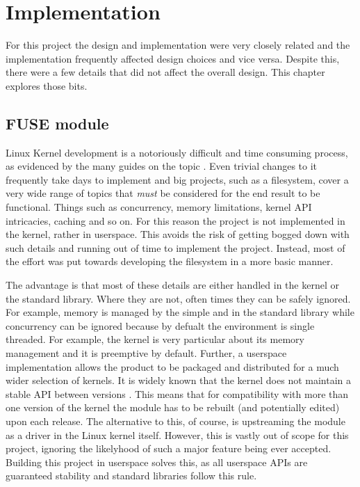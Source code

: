 \chapter{Implementation}

    For this project the design and implementation were very closely related
    and the implementation frequently affected design choices and vice versa.
    Despite this, there were a few details that did not affect the overall
    design. This chapter explores those bits.

    \section{FUSE module}
        \label{sec_FUSE}

        Linux Kernel development is a notoriously difficult and time consuming
        process, as evidenced by the many guides on the topic
        \cite{kernelnewbies_developer} \cite{Linux_howto}. Even trivial changes
        to it frequently take days to implement and big projects, such as a
        filesystem, cover a very wide range of topics that \textit{must} be
        considered for the end result to be functional. Things such as
        concurrency, memory limitations, kernel API intricacies, caching and so
        on. For this reason the project is not implemented in the kernel,
        rather in userspace. This avoids the risk of getting bogged down with
        such details and running out of time to implement the project. Instead,
        most of the effort was put towards developing the filesystem in a more
        basic manner.

        The advantage is that most of these details are either handled in the
        kernel or the standard library. Where they are not, often times they
        can be safely ignored. For example, memory is managed by the simple
         and  in the standard library while
        concurrency can be ignored because by defualt the environment is single
        threaded. For example, the kernel is very particular about its memory
        management and it is preemptive by default. Further, a userspace
        implementation allows the product to be packaged and distributed for a
        much wider selection of kernels. It is widely known that the kernel
        does not maintain a stable API between versions
        \cite{Linux_stable_api}. This means that for compatibility with more
        than one version of the kernel the module has to be rebuilt (and
        potentially edited) upon each release. The alternative to this, of
        course, is upstreaming the module as a driver in the Linux kernel
        itself. However, this is vastly out of scope for this project, ignoring
        the likelyhood of such a major feature being ever accepted. Building
        this project in userspace solves this, as all userspace APIs are
        guaranteed stability \cite{never_break_userspace} and standard
        libraries follow this rule.

